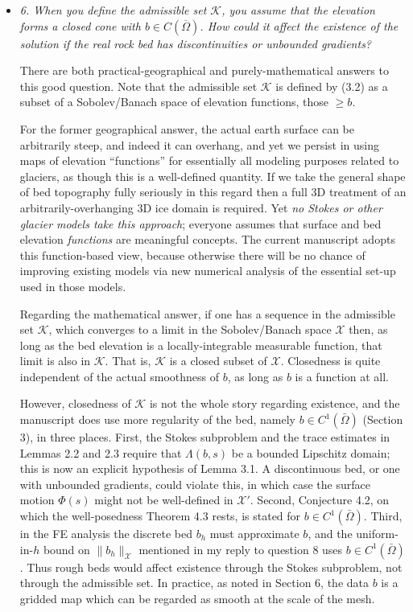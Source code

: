 \documentclass[11pt,reqno]{amsart}
\newcommand{\cK}{\mathcal{K}}
\newcommand{\cX}{\mathcal{X}}
\newcommand{\reply}[2]{%
\medskip
\item \emph{#1}

\medskip
\noindent #2
}
\begin{document}
\begin{itemize}[itemindent=0mm, labelsep=5mm]
\reply{6. When you define the admissible set $\cK$, you assume that the elevation forms a closed cone with $b \in C(\overline{\Omega})$.  How could it affect the existence of the solution if the real rock bed has discontinuities or unbounded gradients?}
{There are both practical-geographical and purely-mathematical answers to this good question.  Note that the admissible set $\cK$ is defined by (3.2) as a subset of a Sobolev/Banach space of elevation functions, those $\ge b$. \par
For the former geographical answer, the actual earth surface can be arbitrarily steep, and indeed it can overhang, and yet we persist in using maps of elevation ``functions'' for essentially all modeling purposes related to glaciers, as though this is a well-defined quantity.  If we take the general shape of bed topography fully seriously in this regard then a full 3D treatment of an arbitrarily-overhanging 3D ice domain is required.  Yet \emph{no Stokes or other glacier models take this approach}; everyone assumes that surface and bed elevation \emph{functions} are meaningful concepts.  The current manuscript adopts this function-based view, because otherwise there will be no chance of improving existing models via new numerical analysis of the essential set-up used in those models. \par
Regarding the mathematical answer, if one has a sequence in the admissible set $\cK$, which converges to a limit in the Sobolev/Banach space $\cX$ then, as long as the bed elevation is a locally-integrable measurable function, that limit is also in $\cK$.  That is, $\cK$ is a closed subset of $\cX$.  Closedness is quite independent of the actual smoothness of $b$, as long as $b$ is a function at all. \par
However, closedness of $\cK$ is not the whole story regarding existence, and the manuscript does use more regularity of the bed, namely $b\in C^1(\bar\Omega)$ (Section 3), in three places.  First, the Stokes subproblem and the trace estimates in Lemmas 2.2 and 2.3 require that $\Lambda(b,s)$ be a bounded Lipschitz domain; this is now an explicit hypothesis of Lemma 3.1.  A discontinuous bed, or one with unbounded gradients, could violate this, in which case the surface motion $\Phi(s)$ might not be well-defined in $\cX'$.  Second, Conjecture 4.2, on which the well-posedness Theorem 4.3 rests, is stated for $b\in C^1(\bar\Omega)$.  Third, in the FE analysis the discrete bed $b_h$ must approximate $b$, and the uniform-in-$h$ bound on $\|b_h\|_\cX$ mentioned in my reply to question 8 uses $b\in C^1(\bar\Omega)$.  Thus rough beds would affect existence through the Stokes subproblem, not through the admissible set.  In practice, as noted in Section 6, the data $b$ is a gridded map which can be regarded as smooth at the scale of the mesh.}


\end{itemize}
\end{document}
